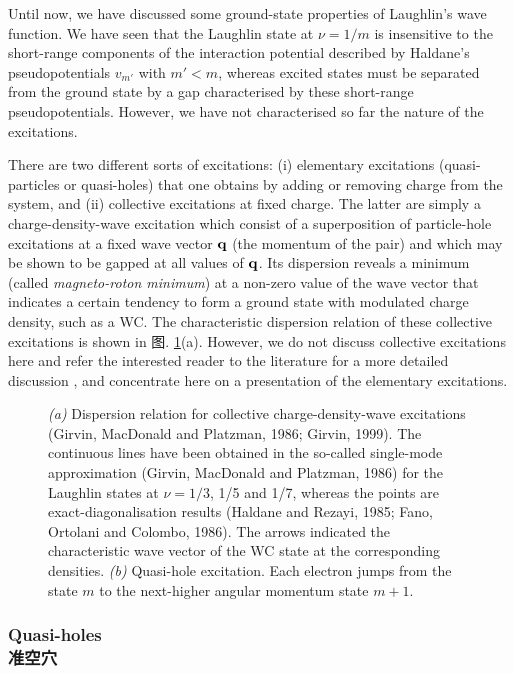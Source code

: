 \documentclass[10pt]{book}
\newcommand{\bq}{{\bf q}}
\begin{document}
Until now, we have discussed some ground-state properties of Laughlin's wave function. We have seen 
that the Laughlin state at $\nu=1/m$ is insensitive to the short-range components of the
interaction potential described by Haldane's pseudopotentials $v_{m'}$ with $m'<m$, whereas excited states
must be separated from the ground state by a gap characterised by these short-range pseudopotentials. However, we have not
characterised so far the nature of the excitations. 

There are two different sorts of excitations: (i) elementary excitations (quasi-particles or quasi-holes) that one obtains by adding
or removing charge from the system, and (ii) collective excitations at fixed charge. The latter are simply a charge-density-wave
excitation which consist of a superposition of particle-hole excitations at a fixed wave vector $\bq$ (the momentum of the pair) and
which may be shown to be gapped at all values of $\bq$. Its dispersion reveals a minimum
(called {\sl magneto-roton minimum})
at a non-zero value of the wave vector that indicates a certain tendency to form a ground state with modulated charge density,
such as a WC. The characteristic dispersion relation of these collective excitations is shown in 图. \ref{fig20}(a).
However, we do not discuss collective excitations
here and refer the interested reader to the literature for a more detailed discussion \cite{GMP,PG,GirvinLH}, and concentrate here on
a presentation of the elementary excitations. 


\begin{figure}
\begin{center}
\end{center}
\caption{ {\sl (a)} Dispersion relation for collective charge-density-wave excitations (Girvin, MacDonald and Platzman, 1986; Girvin, 1999).
The continuous lines have been obtained in the so-called single-mode approximation (Girvin, MacDonald and Platzman, 1986) for
the Laughlin states at $\nu=1/3$, 1/5 and 1/7, whereas the points are exact-diagonalisation results (Haldane and Rezayi, 1985;
Fano, Ortolani and Colombo, 1986). The arrows indicated
the characteristic wave vector of the WC state at the corresponding densities.
{\sl (b)} Quasi-hole excitation. Each electron jumps from the state $m$ to the next-higher angular momentum state $m+1$.}
\label{fig20}
\end{figure}

\subsubsection[准空穴]{Quasi-holes\\\bf 准空穴}
\end{document}
